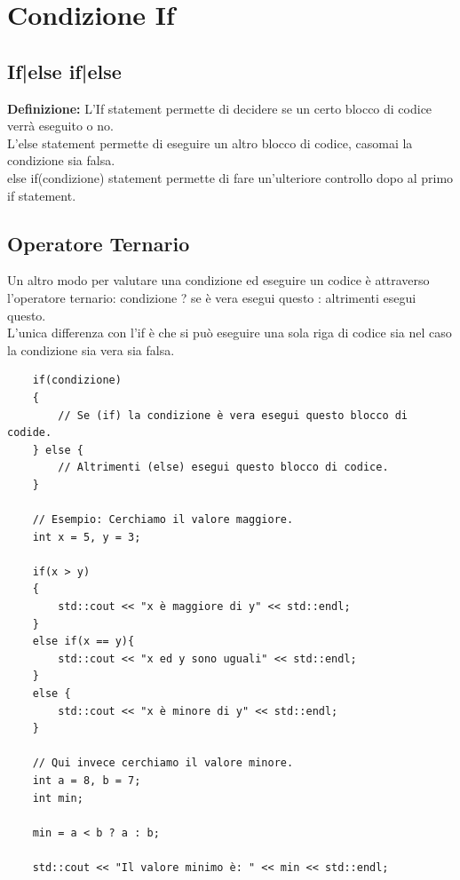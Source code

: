 
\newpage

\section{Condizione If}

\subsection{If|else if|else}

\textsf{\small \textbf{Definizione:} L'If statement permette di decidere se un certo blocco di codice verrà eseguito o no.} \\

\textsf{\small L'else statement permette di eseguire un altro blocco di codice, casomai la condizione sia falsa.} \\

\textsf{\small else if(condizione) statement permette di fare un'ulteriore controllo dopo al primo if statement. } \\

\subsection{Operatore Ternario}

\textsf{\small Un altro modo per valutare una condizione ed eseguire un codice è attraverso l'operatore ternario: condizione ? se è vera esegui questo : altrimenti esegui questo.} \\

\textsf{\small L'unica differenza con l'if è che si può eseguire una sola riga di codice sia nel caso la condizione sia vera sia falsa.} \\

\begin{lstlisting}
	if(condizione)
	{
		// Se (if) la condizione è vera esegui questo blocco di codide.
	} else {
		// Altrimenti (else) esegui questo blocco di codice.
	}

	// Esempio: Cerchiamo il valore maggiore.
	int x = 5, y = 3;
	
	if(x > y)
	{
		std::cout << "x è maggiore di y" << std::endl;
	} 
	else if(x == y){
		std::cout << "x ed y sono uguali" << std::endl;
	}
	else {
		std::cout << "x è minore di y" << std::endl;
	}

	// Qui invece cerchiamo il valore minore.
	int a = 8, b = 7;
	int min;
	
	min = a < b ? a : b;
	
	std::cout << "Il valore minimo è: " << min << std::endl;
\end{lstlisting}

